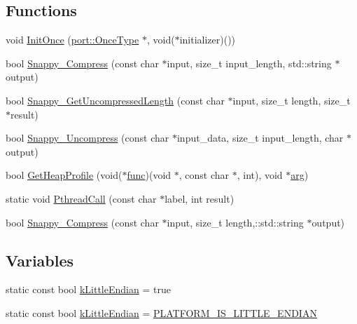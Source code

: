 \subsection*{Functions}
\begin{DoxyCompactItemize}
\item 
void \hyperlink{namespaceleveldb_1_1port_a1493e91d494e6f0ea086a743a562e983}{Init\-Once} (\hyperlink{namespaceleveldb_1_1port_a80651a8fb458d9b7b3c1f492f9abd055}{port\-::\-Once\-Type} $\ast$, void($\ast$initializer)())
\item 
bool \hyperlink{namespaceleveldb_1_1port_ae6e60ac8eb298c7eef3bb70ded8c809f}{Snappy\-\_\-\-Compress} (const char $\ast$input, size\-\_\-t input\-\_\-length, std\-::string $\ast$output)
\item 
bool \hyperlink{namespaceleveldb_1_1port_aad536a786dfc1df63d14c6b74178a73b}{Snappy\-\_\-\-Get\-Uncompressed\-Length} (const char $\ast$input, size\-\_\-t length, size\-\_\-t $\ast$result)
\item 
bool \hyperlink{namespaceleveldb_1_1port_ab6f0c4381b00450e06d3000a8cb48a55}{Snappy\-\_\-\-Uncompress} (const char $\ast$input\-\_\-data, size\-\_\-t input\-\_\-length, char $\ast$output)
\item 
bool \hyperlink{namespaceleveldb_1_1port_a1686423180e60af953153121c615f5fe}{Get\-Heap\-Profile} (void($\ast$\hyperlink{testharness_8cc_a0a8271b25a6a647b48a0be0bc49c9409}{func})(void $\ast$, const char $\ast$, int), void $\ast$\hyperlink{env__posix_8cc_a9ce2ec4812a92cb6ab39f6e81e9173a9}{arg})
\item 
static void \hyperlink{namespaceleveldb_1_1port_a614e0b6f0b21d697fe4001dbe3d8798b}{Pthread\-Call} (const char $\ast$label, int result)
\item 
bool \hyperlink{namespaceleveldb_1_1port_a64d0eafc3cfb484000e6afb5cbcc9d87}{Snappy\-\_\-\-Compress} (const char $\ast$input, size\-\_\-t length,\-::std\-::string $\ast$output)
\end{DoxyCompactItemize}
\subsection*{Variables}
\begin{DoxyCompactItemize}
\item 
static const bool \hyperlink{namespaceleveldb_1_1port_a1d2c52a3c3be0edb6562c9494b85bfec}{k\-Little\-Endian} = true
\item 
static const bool \hyperlink{namespaceleveldb_1_1port_a1d2c52a3c3be0edb6562c9494b85bfec}{k\-Little\-Endian} = \hyperlink{port__posix_8h_a70cdc2961c4e178e613d23a851e57f5d}{P\-L\-A\-T\-F\-O\-R\-M\-\_\-\-I\-S\-\_\-\-L\-I\-T\-T\-L\-E\-\_\-\-E\-N\-D\-I\-A\-N}
\end{DoxyCompactItemize}


